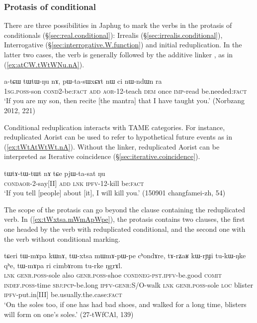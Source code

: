 \subsubsection{Protasis of conditional} \label{sec:redp.protasis}
There are three possibilities in Japhug to mark the verbs in the protasis of conditionals (§\ref{sec:real.conditional}): Irrealis (§\ref{sec:irrealis.conditional}), Interrogative  (§\ref{sec:interrogative.W.function}) and initial reduplication. In the latter two cases, the verb is generally followed by the additive linker , as in (\ref{ex:atCW.tWtWNu.nA}).
 
\begin{exe}
\ex \label{ex:atCW.tWtWNu.nA}
\gll   a-tɕɯ tɯ\redp{}tɯ-ŋu nɤ, pɯ-ta-sɯxɕɤt nɯ ci nɯ-ndɯn ra \\
\textsc{1sg}.\textsc{poss}-son \textsc{cond}\redp{}2-be:\textsc{fact} \textsc{add} \textsc{aor}-1\fl{}2-teach \textsc{dem} once \textsc{imp}-read be.needed:\textsc{fact} \\
\glt `If you are my son, then recite [the mantra] that I have taught you.' (Norbzang 2012, 221)
\end{exe}

Conditional reduplication interacts with TAME categories. For instance, reduplicated Aorist can be used to refer to hypothetical future events as in (\ref{ex:tWtAtWtWt.nA}). Without the  linker, reduplicated Aorist can be interpreted as Iterative coincidence (§\ref{sec:iterative.coincidence}).

\begin{exe}
\ex \label{ex:tWtAtWtWt.nA}
\gll tɯ\redp{}tɤ-tɯ-tɯt nɤ tɕe pjɯ-ta-sat ŋu \\
\textsc{cond}\redp{}\textsc{aor}-2-say[II] \textsc{add} \textsc{lnk} \textsc{ipfv}-1\fl{}2-kill be:\textsc{fact} \\
\glt `If you tell [people] about [it], I will kill you.' (150901 changfamei-zh, 54)
\end{exe}

The scope of the protasis can go beyond the clause containing the reduplicated verb. In (\ref{ex:tWxtsa.mWmApWpe}), the protasis contains two clauses, the first one headed by the verb  with reduplicated conditional, and the second one with the verb  without conditional marking.

\begin{exe}
\ex \label{ex:tWxtsa.mWmApWpe}
\gll tɕeri tɯ-mɤpa kɯnɤ, tɯ-xtsa mɯ\redp{}mɤ-pɯ-pe cʰondɤre,  tɤ-rʑaʁ kɯ-rɲɟi tu-kɯ-ŋke qʰe, tɯ-mɤpa ri cimbɤrom tu-rke ŋgrɤl. \\
\textsc{lnk} \textsc{genr}.\textsc{poss}-sole also \textsc{genr}.\textsc{poss}-shoe \textsc{cond}\redp{}\textsc{neg}-\textsc{pst}.\textsc{ipfv}-be.good  \textsc{comit} \textsc{indef}.\textsc{poss}-time \textsc{sbj}:\textsc{pcp}-be.long \textsc{ipfv}-\textsc{genr}:S/O-walk \textsc{lnk} \textsc{genr}.\textsc{poss}-sole \textsc{loc} blister \textsc{ipfv}-put.in[III] be.usually.the.case:\textsc{fact} \\
\glt `On the soles too, if one has had bad shoes, and walked for a long time, blisters will form on one's soles.' (27-tWfCAl, 139)
\end{exe}

